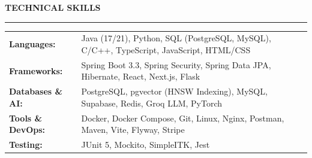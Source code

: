 \documentclass[10pt,letterpaper]{article}
\newenvironment{rSection}[1]{
  \vspace{4pt}
  {\bfseries\MakeUppercase{#1}}
  \vspace{2pt}
  \hrule
  \vspace{3pt}
}{
  \par\vspace{2pt}
}
\begin{document}
\vspace{-0.2cm}
\begin{rSection}{Technical Skills}
\begin{tabular}{@{} >{\bfseries}l @{\hspace{4ex}} l @{}}
    Languages:       & Java (17/21), Python, SQL (PostgreSQL, MySQL), C/C++, TypeScript, JavaScript, HTML/CSS \\
    Frameworks:      & Spring Boot 3.3, Spring Security, Spring Data JPA, Hibernate, React, Next.js, Flask \\
    Databases \& AI: & PostgreSQL, pgvector (HNSW Indexing), MySQL, Supabase, Redis, Groq LLM, PyTorch \\
    Tools \& DevOps: & Docker, Docker Compose, Git, Linux, Nginx, Postman, Maven, Vite, Flyway, Stripe \\
    Testing:         & JUnit 5, Mockito, SimpleITK, Jest \\
\end{tabular}
\end{rSection}
\end{document}
